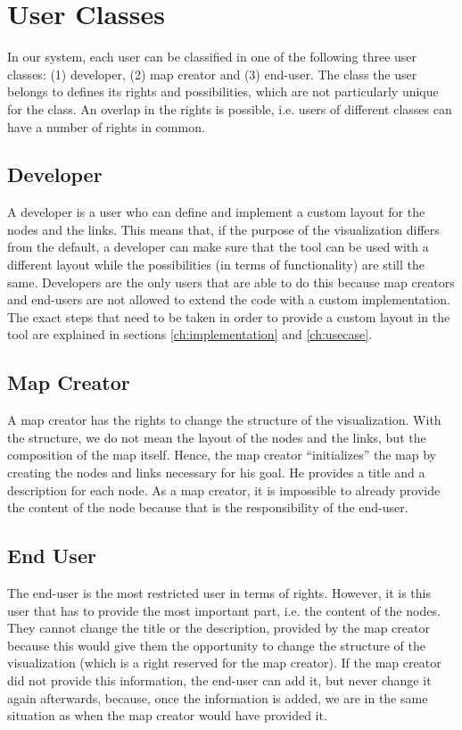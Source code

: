 \section{User Classes}\label{sec:user-classes}
In our system, each user can be classified in one of the following three user classes: (1) developer, (2) map creator and (3) end-user. The class the user belongs to defines its rights and possibilities, which are not particularly unique for the class. An overlap in the rights is possible, i.e. users of different classes can have a number of rights in common.

\subsection{Developer}\label{sec:user-class-developer}
A developer is a user who can define and implement a custom layout for the nodes and the links. This means that, if the purpose of the visualization differs from the default, a developer can make sure that the tool can be used with a different layout while the possibilities (in terms of functionality) are still the same. Developers are the only users that are able to do this because map creators and end-users are not allowed to extend the code with a custom implementation. The exact steps that need to be taken in order to provide a custom layout in the tool are explained in sections \ref{ch:implementation} and \ref{ch:usecase}.

\subsection{Map Creator}\label{sec:user-class-map-creator}
A map creator has the rights to change the structure of the visualization. With the structure, we do not mean the layout of the nodes and the links, but the composition of the map itself. Hence, the map creator ``initializes'' the map by creating the nodes and links necessary for his goal. He provides a title and a description for each node. As a map creator, it is impossible to already provide the content of the node because that is the responsibility of the end-user. 

\subsection{End User}\label{sec:user-class-end-user}
The end-user is the most restricted user in terms of rights. However, it is this user that has to provide the most important part, i.e. the content of the nodes. They cannot change the title or the description, provided by the map creator because this would give them the opportunity to change the structure of the visualization (which is a right reserved for the map creator). If the map creator did not provide this information, the end-user can add it, but never change it again afterwards, because, once the information is added, we are in the same situation as when the map creator would have provided it.



